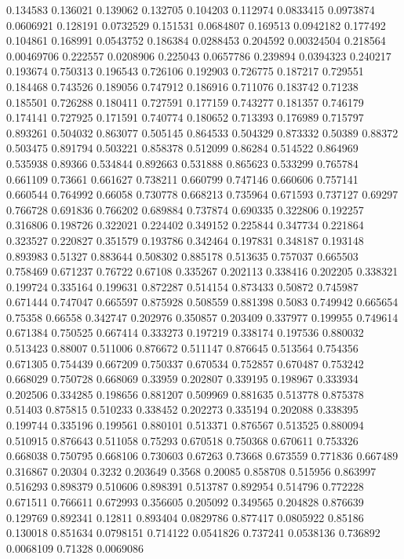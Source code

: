 0.134583 0.136021
0.139062 0.132705
0.104203 0.112974
0.0833415 0.0973874
0.0606921 0.128191
0.0732529 0.151531
0.0684807 0.169513
0.0942182 0.177492
0.104861 0.168991
0.0543752 0.186384
0.0288453 0.204592
0.00324504 0.218564
0.00469706 0.222557
0.0208906 0.225043
0.0657786 0.239894
0.0394323 0.240217
0.193674 0.750313
0.196543 0.726106
0.192903 0.726775
0.187217 0.729551
0.184468 0.743526
0.189056 0.747912
0.186916 0.711076
0.183742 0.71238
0.185501 0.726288
0.180411 0.727591
0.177159 0.743277
0.181357 0.746179
0.174141 0.727925
0.171591 0.740774
0.180652 0.713393
0.176989 0.715797
0.893261 0.504032
0.863077 0.505145
0.864533 0.504329
0.873332 0.50389
0.88372 0.503475
0.891794 0.503221
0.858378 0.512099
0.86284 0.514522
0.864969 0.535938
0.89366 0.534844
0.892663 0.531888
0.865623 0.533299
0.765784 0.661109
0.73661 0.661627
0.738211 0.660799
0.747146 0.660606
0.757141 0.660544
0.764992 0.66058
0.730778 0.668213
0.735964 0.671593
0.737127 0.69297
0.766728 0.691836
0.766202 0.689884
0.737874 0.690335
0.322806 0.192257
0.316806 0.198726
0.322021 0.224402
0.349152 0.225844
0.347734 0.221864
0.323527 0.220827
0.351579 0.193786
0.342464 0.197831
0.348187 0.193148
0.893983 0.51327
0.883644 0.508302
0.885178 0.513635
0.757037 0.665503
0.758469 0.671237
0.76722 0.67108
0.335267 0.202113
0.338416 0.202205
0.338321 0.199724
0.335164 0.199631
0.872287 0.514154
0.873433 0.50872
0.745987 0.671444
0.747047 0.665597
0.875928 0.508559
0.881398 0.5083
0.749942 0.665654
0.75358 0.66558
0.342747 0.202976
0.350857 0.203409
0.337977 0.199955
0.749614 0.671384
0.750525 0.667414
0.333273 0.197219
0.338174 0.197536
0.880032 0.513423
0.88007 0.511006
0.876672 0.511147
0.876645 0.513564
0.754356 0.671305
0.754439 0.667209
0.750337 0.670534
0.752857 0.670487
0.753242 0.668029
0.750728 0.668069
0.33959 0.202807
0.339195 0.198967
0.333934 0.202506
0.334285 0.198656
0.881207 0.509969
0.881635 0.513778
0.875378 0.51403
0.875815 0.510233
0.338452 0.202273
0.335194 0.202088
0.338395 0.199744
0.335196 0.199561
0.880101 0.513371
0.876567 0.513525
0.880094 0.510915
0.876643 0.511058
0.75293 0.670518
0.750368 0.670611
0.753326 0.668038
0.750795 0.668106
0.730603 0.67263
0.73668 0.673559
0.771836 0.667489
0.316867 0.20304
0.3232 0.203649
0.3568 0.20085
0.858708 0.515956
0.863997 0.516293
0.898379 0.510606
0.898391 0.513787
0.892954 0.514796
0.772228 0.671511
0.766611 0.672993
0.356605 0.205092
0.349565 0.204828
0.876639 0.129769
0.892341 0.12811
0.893404 0.0829786
0.877417 0.0805922
0.85186 0.130018
0.851634 0.0798151
0.714122 0.0541826
0.737241 0.0538136
0.736892 0.0068109
0.71328 0.0069086
